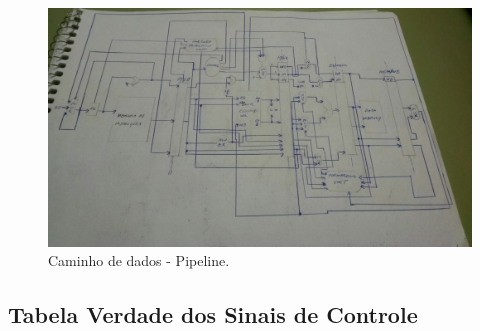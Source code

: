 \documentclass[12pt]{article}
\begin{document}
\begin{figure}[H]
	\flushleft
	\includegraphics[width=1\textwidth]{pipe.jpg}
	\caption{Caminho de dados - Pipeline.}
	\label{fig:pfunct}
\end{figure}

\subsection{Tabela Verdade dos Sinais de Controle}
\end{document}
